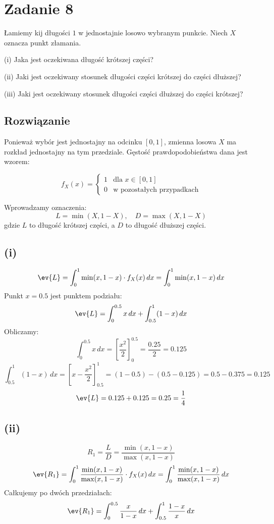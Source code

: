 \section{Zadanie 8}
Łamiemy kij długości \(1\) w jednostajnie losowo wybranym punkcie.
Niech \(X\) oznacza punkt złamania.


(i) Jaka jest oczekiwana długość krótszej części?

(ii) Jaki jest oczekiwany stosunek długości części krótszej do części dłuższej?

(iii) Jaki jest oczekiwany stosunek długości części dłuższej do części krótszej?


\subsection*{Rozwiązanie}
Ponieważ wybór jest jednostajny na odcinku \([0,1]\), zmienna losowa \(X\) ma rozkład jednostajny na tym przedziale. Gęstość prawdopodobieństwa dana jest wzorem:

\[
	f_X(x) =
	\begin{cases}
		1 & \text{dla } x \in [0,1]          \\
		0 & \text{w pozostałych przypadkach}
	\end{cases}
\]

Wprowadzamy oznaczenia:
\[
	L = \min(X, 1-X), \quad D = \max(X, 1-X)
\]
gdzie \(L\) to długość krótszej części, a \(D\) to długość dłuższej części.

\subsection*{(i)}
\[
	\ev{L} = \int_{0}^{1} \min(x, 1-x) \cdot f_X(x) \, dx = \int_{0}^{1} \min(x, 1-x) \, dx
\]
Punkt \(x = 0.5\) jest punktem podziału:
\[
	\ev{L} = \int_{0}^{0.5} x \, dx + \int_{0.5}^{1} (1-x) \, dx
\]
Obliczamy:
\[
	\int_{0}^{0.5} x \, dx = \left[ \frac{x^2}{2} \right]_{0}^{0.5} = \frac{0.25}{2} = 0.125
\]
\[
	\int_{0.5}^{1} (1-x) \, dx = \left[ x - \frac{x^2}{2} \right]_{0.5}^{1} = (1-0.5) - (0.5 - 0.125) = 0.5 - 0.375 = 0.125
\]
\[
	\ev{L} = 0.125 + 0.125 = 0.25 = \frac14
\]

\subsection*{(ii)}
\[
	R_1 = \frac{L}{D} = \frac{\min(x, 1-x)}{\max(x, 1-x)}
\]
\[
	\ev{R_1} = \int_{0}^{1} \frac{\min(x, 1-x)}{\max(x, 1-x)} \cdot f_X(x) \, dx = \int_{0}^{1} \frac{\min(x, 1-x)}{\max(x, 1-x)} \, dx
\]
Całkujemy po dwóch przedziałach:
\[
	\ev{R_1} = \int_{0}^{0.5} \frac{x}{1-x} \, dx + \int_{0.5}^{1} \frac{1-x}{x} \, dx
\]

